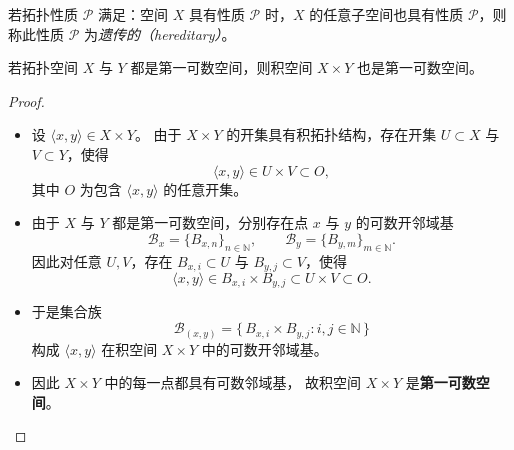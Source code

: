 \begin{definition}[遗传性质]
若拓扑性质 $\mathcal{P}$ 满足：空间 $X$ 具有性质 $\mathcal{P}$ 时，$X$ 的任意子空间也具有性质 $\mathcal{P}$，则称此性质 $\mathcal{P}$ 为\emph{遗传的（hereditary）}。
\end{definition}
\begin{theorem}[积空间的第一可数性]
若拓扑空间 $X$ 与 $Y$ 都是第一可数空间，则积空间 $X\times Y$ 也是第一可数空间。
\end{theorem}

\begin{proof}
\begin{itemize}
  \item[(1)] 设 $\langle x,y\rangle \in X\times Y$。  
  由于 $X\times Y$ 的开集具有积拓扑结构，存在开集 $U\subset X$ 与 $V\subset Y$，使得
  \[
  \langle x,y\rangle \in U\times V \subset O,
  \]
  其中 $O$ 为包含 $\langle x,y\rangle$ 的任意开集。

  \item[(2)] 由于 $X$ 与 $Y$ 都是第一可数空间，分别存在点 $x$ 与 $y$ 的可数开邻域基
  \[
  \mathcal{B}_x = \{B_{x,n}\}_{n\in\mathbb{N}}, \qquad 
  \mathcal{B}_y = \{B_{y,m}\}_{m\in\mathbb{N}}.
  \]
  因此对任意 $U,V$，存在 $B_{x,i}\subset U$ 与 $B_{y,j}\subset V$，使得
  \[
  \langle x,y\rangle \in B_{x,i}\times B_{y,j} \subset U\times V \subset O.
  \]

  \item[(3)] 于是集合族
  \[
  \mathcal{B}_{(x,y)} = 
  \{\,B_{x,i}\times B_{y,j} : i,j\in\mathbb{N}\,\}
  \]
  构成 $\langle x,y\rangle$ 在积空间 $X\times Y$ 中的可数开邻域基。

  \item[(4)] 因此 $X\times Y$ 中的每一点都具有可数邻域基，
  故积空间 $X\times Y$ 是\textbf{第一可数空间}。
\end{itemize}
\end{proof}













